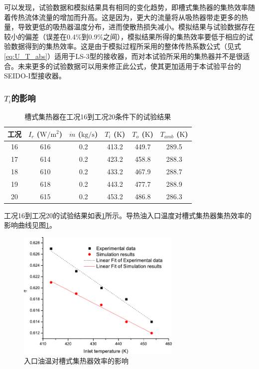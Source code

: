 可以发现，试验数据和模拟结果具有相同的变化趋势，即槽式集热器的集热效率随着传热流体流量的增加而升高。这是因为，更大的流量将从吸热器带走更多的热量，导致更低的吸热器温度分布，进而使散热损失减小。模拟结果与试验数据存在较小的偏差（误差在0.4\%到0.9\%之间），模拟结果所得的集热效率要低于相应的试验数据得到的集热效率。这是由于模拟过程所采用的整体传热系数公式（见式\ref{eq:U_T_abs}）适用于LS-3型的接收器，而对本试验所采用的集热器并不是很适合。未来更多的试验数据可以用来修正此公式，使其更加适用于本试验平台的SEIDO-I型接收器。

\subsubsection{$T_i$的影响}

\begin{table}[htbp]\footnotesize
	\caption{槽式集热器在工况16到工况20条件下的试验结果}
	\begin{center}
	\begin{tabular}{cccccc}
		\toprule
		工况	& $I_r$ ($\mathrm{W/m^2}$)	&	$\dot{m}$ ($\mathrm{kg/s}$)			&	$T_i$ ($\mathrm{K}$)	&	$T_o$ ($\mathrm{K}$)		&	$T_{amb}$ ($\mathrm{K}$)\\
		\midrule
		16	&	616	&	0.2	&	413.2	&	449.7	&	289.5\\
		17	&	614	&	0.2	&	423.2	&	458.8	&	288.3\\
		18	&	610	&	0.2	&	433.2	&	467.9	&	288.7	\\
		19	&	618	&	0.2	&	443.2	&	477.7	&	288.9\\
		20	&	615	&	0.2	&	453.2	&	486.8	&	286.3\\
		\bottomrule
	\end{tabular}
	\end{center}
	\label{tab:ResultOfTrough3}
\end{table}
工况16到工况20的试验结果如表\ref{tab:ResultOfTrough3}所示。导热油入口温度对槽式集热器集热效率的影响曲线见图\ref{fig:T_i-eta-trough}。

\begin{figure}[!ht]
\centering
\includegraphics[width=0.7\textwidth]{fig/T_i-eta-trough}
\caption{入口油温对槽式集热器效率的影响}
\label{fig:T_i-eta-trough}
\end{figure}

